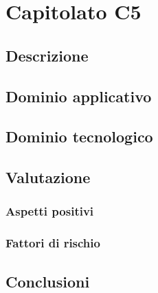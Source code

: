 \documentclass[../StudioDiFattibilita.tex]{subfiles}
\begin{document}
	\section{Capitolato C5}
		\subsection{Descrizione}
		\subsection{Dominio applicativo}
		\subsection{Dominio tecnologico}
		\subsection{Valutazione}
			\subsubsection{Aspetti positivi}
			\subsubsection{Fattori di rischio}
			\subsection{Conclusioni}
\end{document}
